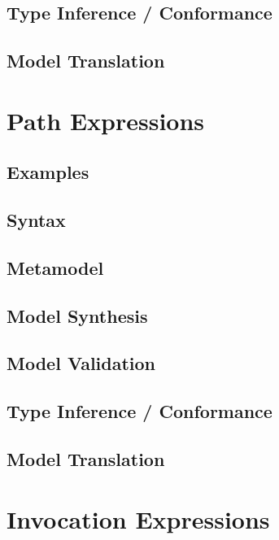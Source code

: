 \documentclass[a4paper,oneside,12pt, extrafontsizes]{memoir}
\begin{document}
    \section{Type Inference / Conformance}
    

    \section{Model Translation}
    

  \chapter{Path Expressions}
  \label{ch:paths}
  

    \section{Examples}
    

    \section{Syntax}
    

    \section{Metamodel}

    \section{Model Synthesis}

    \section{Model Validation}

    \section{Type Inference / Conformance}

    \section{Model Translation}

  \chapter{Invocation Expressions}
  \label{ch:invocations}
  
\end{document}
